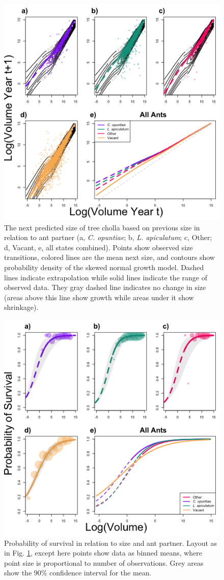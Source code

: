 \documentclass[11pt]{article}
\begin{document}
\begin{figure}[H]
	\includegraphics[width = 0.75\linewidth]{Figures/grow_contour_v2.png}
	\caption{The next predicted size of tree cholla based on previous size in relation to ant partner (a, \textit{C. opuntiae}; b, \textit{L. apiculatum}; c, Other; d, Vacant, e, all states combined). Points show observed size transitions, colored lines are the mean next size, and contours show probability density of the skewed normal growth model.  
	Dashed lines indicate extrapolation while solid lines indicate the range of observed data.
	They gray dashed line indicates no change in size (areas above this line show growth while areas under it show shrinkage).}
	\label{fig:Grow}
\end{figure}

\begin{figure}[H]
\includegraphics[width=0.75\linewidth]{Figures/survival_plot.png}
\caption{Probability of survival in relation to size and ant partner. Layout as in Fig. \ref{fig:Grow}, except here points show data as binned means, where point size is proportional to number of observations. Grey areas show the 90\% confidence interval for the mean.}
\label{fig:Surv}
\end{figure}
\end{document}
